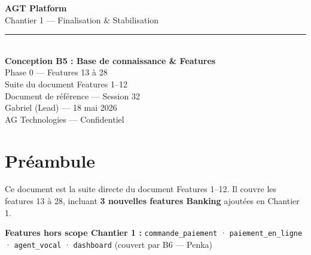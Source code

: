 \documentclass[11pt,a4paper]{article}
\newcommand{\slug}[1]{\texttt{\color{AGTDark}#1}}
\newcommand{\banking}[1]{\textcolor{AGTBanking}{\textbf{#1}}}
\begin{document}
\begin{titlepage}
  \pagecolor{AGTDark}
  \color{white}
  \vspace*{3cm}
  \begin{center}
    {\Huge\bfseries AGT Platform}\\[0.6em]
    {\LARGE Chantier 1 — Finalisation \& Stabilisation}\\[2em]
    \color{AGTPrimary}
    \rule{0.6\textwidth}{2pt}\\[1.5em]
    \color{white}
    {\Large\bfseries Conception B5 : Base de connaissance \& Features}\\[0.5em]
    {\large Phase 0 — Features 13 à 28}\\[0.5em]
    {\large\color{AGTGray} Suite du document Features 1--12}\\[3em]
    \color{AGTGray}
    {\normalsize Document de référence — Session 32}\\[0.3em]
    {\normalsize Gabriel (Lead) — 18 mai 2026}\\[0.3em]
    {\normalsize AG Technologies — Confidentiel}
  \end{center}
  \vfill
  \begin{center}
  \end{center}
\end{titlepage}
\nopagecolor

\tableofcontents
\newpage

\section{Préambule}

Ce document est la suite directe du document Features 1--12.
Il couvre les features 13 à 28, incluant \banking{3 nouvelles features Banking}
ajoutées en Chantier 1.

\begin{hssbox}
\textbf{Features hors scope Chantier 1 :}
\slug{commande\_paiement} · \slug{paiement\_en\_ligne} · \slug{agent\_vocal} ·
\slug{dashboard} (couvert par B6 — Penka)
\end{hssbox}

\end{document}
